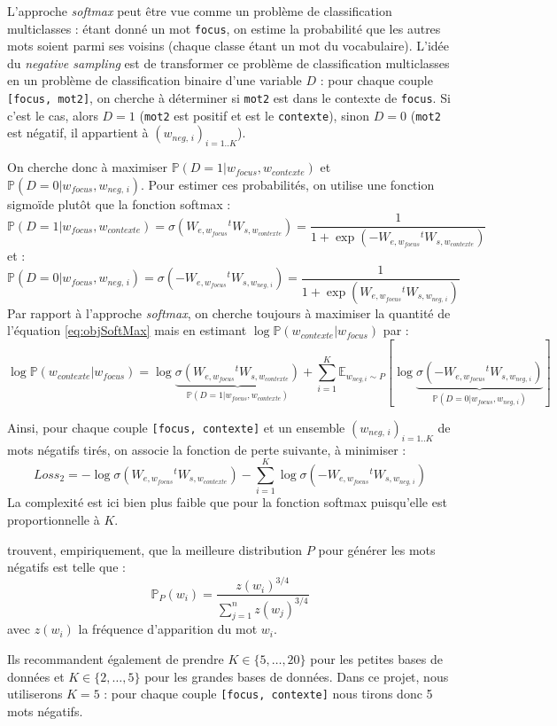 \documentclass[11pt,french,french]{article}
\begin{document}
L'approche \emph{softmax} peut être vue comme un problème de
classification multiclasses : étant donné un mot \texttt{focus}, on
estime la probabilité que les autres mots soient parmi ses voisins
(chaque classe étant un mot du vocabulaire). L'idée du \emph{negative
sampling} est de transformer ce problème de classification multiclasses
en un problème de classification binaire d'une variable \(D\) : pour
chaque couple \texttt{{[}focus,\ mot2{]}}, on cherche à déterminer si
\texttt{mot2} est dans le contexte de \texttt{focus}. Si c'est le cas,
alors \(D=1\) (\texttt{mot2} est positif et est le \texttt{contexte}),
sinon \(D=0\) (\texttt{mot2} est négatif, il appartient à
\((w_{neg,\,i})_{i=1..K}\)).

On cherche donc à maximiser
\(\mathbb P(D=1\vert w_{focus},w_{contexte})\) et
\(\mathbb P(D=0\vert w_{focus},w_{neg,\,i})\). Pour estimer ces
probabilités, on utilise une fonction sigmoïde plutôt que la fonction
softmax : \[
\mathbb P(D=1\vert w_{focus},w_{contexte})=\sigma(W_{e,w_{focus}}{}^tW_{s,w_{contexte}}) = 
\frac{1}{1+\exp(-W_{e,w_{focus}}{}^tW_{s,w_{contexte}})}
\] et : \[
\mathbb P(D=0\vert w_{focus},w_{neg,\,i})=\sigma(-W_{e,w_{focus}}{}^tW_{s,w_{neg,\,i}}) = 
\frac{1}{1+\exp(W_{e,w_{focus}}{}^tW_{s,w_{neg,\,i}})}
\] Par rapport à l'approche \emph{softmax}, on cherche toujours à
maximiser la quantité de l'équation \eqref{eq:objSoftMax} mais en estimant
\(\log\mathbb P(w_{contexte}\vert w_{focus})\) par : \[
\log\mathbb P(w_{contexte}\vert w_{focus}) =
\log\underbrace{\sigma (W_{e,w_{focus}}{}^tW_{s,w_{contexte}})}_{
\mathbb P(D=1\vert w_{focus},w_{contexte})
}+
\sum_{i=1}^K\mathbb E_{w_{neg,i}\sim P}[
\log
\underbrace{\sigma (-W_{e,w_{focus}}{}^tW_{s,w_{neg,\,i}})}_{
\mathbb P(D=0\vert w_{focus},w_{neg,\,i})
}
]
\]

Ainsi, pour chaque couple \texttt{{[}focus,\ contexte{]}} et un ensemble
\((w_{neg,\,i})_{i=1..K}\) de mots négatifs tirés, on associe la
fonction de perte suivante, à minimiser : \[
Loss_{2}=-\log\sigma (W_{e,w_{focus}}{}^tW_{s,w_{contexte}})
-
\sum_{i=1}^K
\log
\sigma (-W_{e,w_{focus}}{}^tW_{s,w_{neg,\,i}})
\] La complexité est ici bien plus faible que pour la fonction softmax
puisqu'elle est proportionnelle à \(K\).

\cite{MikolovNS} trouvent, empiriquement, que la meilleure distribution
\(P\) pour générer les mots négatifs est telle que : \[
\mathbb P_P(w_i) = \frac{z(w_i)^{3/4}}{
\sum_{j=1}^n z(w_j)^{3/4}
}
\] avec \(z(w_i)\) la fréquence d'apparition du mot \(w_i\).

Ils recommandent également de prendre \(K\in\{5,\dots,20\}\) pour les
petites bases de données et \(K\in\{2,\dots,5\}\) pour les grandes bases
de données. Dans ce projet, nous utiliserons \(K=5\) : pour chaque
couple \texttt{{[}focus,\ contexte{]}} nous tirons donc 5 mots négatifs.
\end{document}
